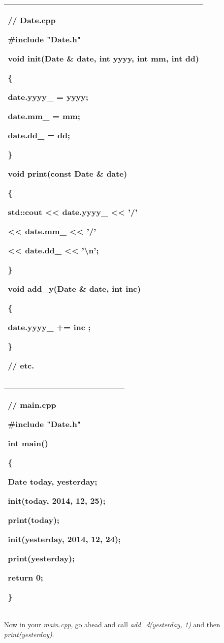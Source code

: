 \documentclass[
]{article}
\begin{document}
\begin{longtable}[]{@{}l@{}}
\toprule
\endhead
\begin{minipage}[t]{0.97\columnwidth}\raggedright
// Date.cpp

\#include "Date.h"

void init(Date \& date, int yyyy, int mm, int dd)

\{

date.yyyy\_ = yyyy;

date.mm\_ = mm;

date.dd\_ = dd;

\}

void print(const Date \& date)

\{

std::cout \textless\textless{} date.yyyy\_ \textless\textless{} '/'

\textless\textless{} date.mm\_ \textless\textless{} '/'

\textless\textless{} date.dd\_ \textless\textless{} '\textbackslash n';

\}

void add\_y(Date \& date, int inc)

\{

date.yyyy\_ += inc ;

\}

// etc.\strut
\end{minipage}\tabularnewline
\bottomrule
\end{longtable}

\begin{longtable}[]{@{}l@{}}
\toprule
\endhead
\begin{minipage}[t]{0.97\columnwidth}\raggedright
// main.cpp

\#include "Date.h"

int main()

\{

Date today, yesterday;

init(today, 2014, 12, 25);

print(today);

init(yesterday, 2014, 12, 24);

print(yesterday);

return 0;

\}\strut
\end{minipage}\tabularnewline
\bottomrule
\end{longtable}

Now in your \emph{main.cpp}, go ahead and call \emph{add\_d(yesterday,
1)} and then \emph{print(yesterday)}.
\end{document}
